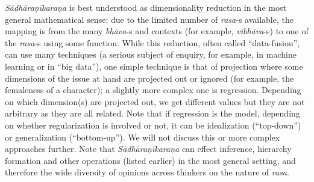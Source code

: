 \textsl{Sādhāraṇīkaraṇa} is best understood as dimensionality reduction in the most general mathematical sense: due to the limited number of \textsl{rasa}-s available, the mapping is from the many \textsl{bhāva}-s and contexts (for example, \textsl{vibhāva}-s) to one of the \textsl{rasa}-s using some function. While this reduction, often called ``data-fusion'', can use many techniques (a serious subject of enquiry, for example, in machine learning or in “big data”), one simple technique is that of projection where some dimensions of the issue at hand are projected out or ignored (for example, the femaleness of a character); a slightly more complex one is regression. Depending on which dimension(s) are projected out, we get different values but they are not arbitrary as they are all related. Note that if regression is the model, depending on whether regularization is involved or not, it can be idealization (“top-down”) or generalization (“bottom-up”). We will not discuss this or more complex approaches further. Note that \textsl{Sādhāraṇīkaraṇa} can effect inference, hierarchy formation and other operations (listed earlier) in the most general setting, and therefore the wide diversity of opinions across thinkers on the nature of \textsl{rasa}.


